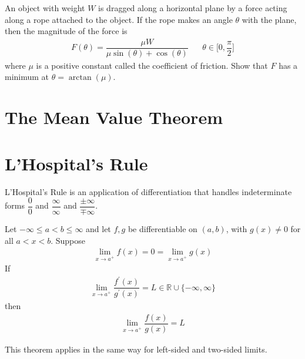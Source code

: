 \begin{exercise}
An object with weight $W$ is dragged along a horizontal plane by a force acting along a rope attached to the object. If the rope makes an angle $\theta$ with the plane, then the magnitude of the force is 
\begin{align*}
    F(\theta) = \dfrac{\mu W}{\mu \sin(\theta) + \cos(\theta)} \hspace{20pt} \theta \in \Big[0, \dfrac{\pi}{2}\Big] 
\end{align*}
where $\mu$ is a positive constant called the coefficient of friction. Show that $F$ has a minimum at $\theta = \arctan(\mu)$.
\end{exercise}

\newpage
\section{The Mean Value Theorem}



\newpage
\section{L'Hospital's Rule}

L'Hospital's Rule is an application of differentiation that handles indeterminate forms $\dfrac{0}{0}$ and $\dfrac{\infty}{\infty}$ and $\dfrac{\pm \infty}{\mp \infty}$.

\vspace{0.1in}
\begin{theorem}
Let $-\infty \leq a < b \leq \infty$ and let $f, g$ be differentiable on $(a, b)$, with $g(x) \neq 0$ for all $a < x < b$. Suppose 
\begin{align*}
    \lim_{x \longrightarrow a^{+}} f(x) = 0 = \lim_{x \longrightarrow a^{+}} g(x)
\end{align*}
If
\begin{align*}
    \lim_{x \longrightarrow a^{+}} \dfrac{f^{'}(x)}{g^{'}(x)} = L \in \mathbb{R} \cup \{-\infty, \infty\}
\end{align*}
then
\begin{align*}
    \lim_{x \longrightarrow a^{+}} \dfrac{f(x)}{g(x)} = L
\end{align*}
\label{L'Hospital_1}
\end{theorem}

\begin{note}
This theorem applies in the same way for left-sided and two-sided limits.
\end{note}

